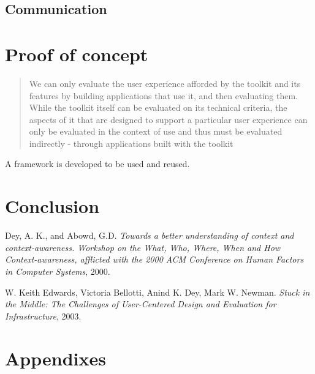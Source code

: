 \documentclass[]{report}
\begin{document}
\section{Communication}


\chapter{Proof of concept}

\blockquote{
We can only evaluate the user experience afforded by the toolkit and its features by building applications that use it, and then evaluating them. While the toolkit itself can be evaluated on its technical criteria, the aspects of it that are designed to support a particular user experience can only be evaluated in the context of use and thus must be evaluated indirectly - through applications built with the toolkit}\cite{Infrastructure (2003)}

A framework is developed to be used and reused.


\chapter{Conclusion}

\begin{thebibliography}{9}

  Dey, A. K., and Abowd, G.D.
  \emph{Towards a better understanding of context and context-awareness. Workshop on the What, Who, Where, When and How Context-awareness, afflicted with the 2000 ACM Conference on Human Factors in Computer Systems},
  2000.
  
  W. Keith Edwards, Victoria Bellotti, Anind K. Dey,
  Mark W. Newman.
  \emph{Stuck in the Middle: The Challenges of
  User-Centered Design and Evaluation for Infrastructure},
  2003.

\end{thebibliography}
\chapter{Appendixes}
\end{document}
